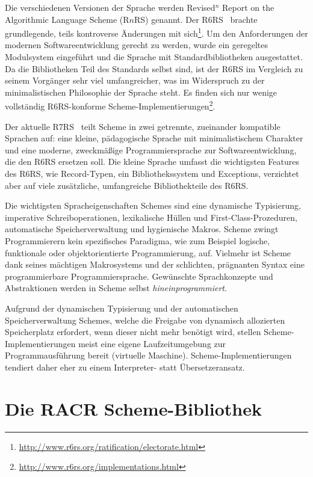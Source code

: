 Die verschiedenen Versionen der Sprache werden Revised$^n$ Report on the Algorithmic Language Scheme (R$n$RS) genannt. Der R6RS~\cite{Sperber2009} brachte grundlegende, teils kontroverse Änderungen mit sich\footnote{\url{http://www.r6rs.org/ratification/electorate.html}}. Um den Anforderungen der modernen Softwareentwicklung gerecht zu werden, wurde ein geregeltes Modulsystem eingeführt und die Sprache mit Standardbibliotheken ausgestattet. Da die Bibliotheken Teil des Standards selbst sind, ist der R6RS im Vergleich zu seinem Vorgänger sehr viel umfangreicher, was im Widerspruch zu der minimalistischen Philosophie der Sprache steht. Es finden sich nur wenige vollständig R6RS-konforme Scheme-Implementierungen\footnote{\url{http://www.r6rs.org/implementations.html}}.

Der aktuelle R7RS~\cite{Shinn2013} teilt Scheme in zwei getrennte, zueinander kompatible Sprachen auf: eine kleine, pädagogische Sprache mit minimalistischem Charakter und eine moderne, zweckmäßige Programmiersprache zur Softwareentwicklung, die den R6RS ersetzen soll. Die kleine Sprache umfasst die wichtigsten Features des R6RS, wie Record-Typen, ein Bibliothekssystem und Exceptions, verzichtet aber auf viele zusätzliche, umfangreiche Bibliothekteile des R6RS.

Die wichtigsten Spracheigenschaften Schemes sind eine dynamische Typisierung, imperative Schreiboperationen, lexikalische Hüllen und First-Class-Prozeduren, automatische Speicherverwaltung und hygienische Makros. Scheme zwingt Programmierern kein spezifisches Paradigma, wie zum Beispiel logische, funktionale oder objektorientierte Programmierung, auf.  Vielmehr ist Scheme dank seines mächtigen Makrosystems und der schlichten, prägnanten Syntax eine programmierbare Programmiersprache. Gewünschte Sprachkonzepte und Abstraktionen werden in Scheme selbst \textit{hineinprogrammiert}.

Aufgrund der dynamischen Typisierung und der automatischen Speicherverwaltung Schemes, welche die Freigabe von dynamisch allozierten Speicherplatz erfordert, wenn dieser nicht mehr benötigt wird, stellen Scheme-Implementierungen meist eine eigene Laufzeitumgebung zur Programmausführung bereit (virtuelle Maschine). Scheme-Implementierungen tendiert daher eher zu einem Interpreter- statt Übersetzeransatz.

\section{Die RACR Scheme-Bibliothek}

